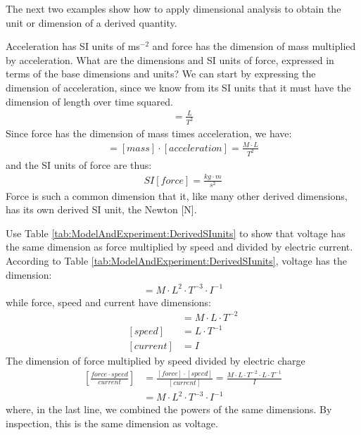 The next two examples show how to apply dimensional analysis to obtain the unit or dimension of a derived quantity. 

\newpage
\begin{example}{\label{ex:modelandexperiment:forceSI}Acceleration has SI units of ms$^{-2}$ and force has the dimension of mass multiplied by acceleration. What are the dimensions and SI units of force, expressed in terms of the base dimensions and units?}
We can start by expressing the dimension of acceleration, since we know from its SI units that it must have the dimension of length over time squared.
\begin{align*}
[acceleration] = \frac{L}{T^2}
\end{align*}
Since force has the dimension of mass times acceleration, we have:
\begin{align*}
[force] = [mass]\cdot[acceleration] = \frac{M\cdot L}{T^2}
\end{align*}
and the SI units of force are thus:
\begin{align*}
SI[force] = \frac{kg \cdot m}{s^2}
\end{align*}
Force is such a common dimension that it, like many other derived dimensions, has its own derived SI unit, the Newton [N].
\end{example}

\begin{example}{Use Table \ref{tab:ModelAndExperiment:DerivedSIunits} to show that voltage has the same dimension as force multiplied by speed and divided by electric current.}
According to Table \ref{tab:ModelAndExperiment:DerivedSIunits}, voltage has the dimension:
\begin{align*}
[voltage]=M\cdot L^2 \cdot T^{-3}\cdot I^{-1}
\end{align*}
while force, speed and current have dimensions:
\begin{align*}
[force]&=M\cdot L\cdot T^{-2} \\
[speed]&=L\cdot T^{-1}\\
[current]&=I
\end{align*}
The dimension of force multiplied by speed divided by electric charge
\begin{align*}
\left[\frac{force\cdot speed}{current}\right]&=\frac{[force]\cdot [speed]}{[current]}=\frac{M\cdot L\cdot T^{-2} \cdot L\cdot T^{-1} }{I}\\
&=M\cdot L^2 \cdot T^{-3}\cdot I^{-1}
\end{align*}
where, in the last line, we combined the powers of the same dimensions. By inspection, this is the same dimension as voltage.
\end{example}

